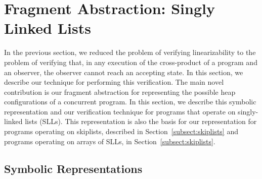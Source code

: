 \section{Fragment Abstraction: Singly Linked Lists}
\label{sec:fragment-abstraction}
In the previous section, we reduced the problem of verifying linearizability
to the problem of verifying
that, in any execution of the cross-product of a program and an observer, 
the observer cannot reach an accepting state.
In this section, we describe our technique for performing this verification.
The main novel contribution is our fragment abstraction for
representing the possible heap configurations of a concurrent program.
In this section, we describe this symbolic representation and our
verification technique
for programs that operate on singly-linked lists (SLLs). This
representation is also the basis for our representation for programs
operating on skiplists, described in Section~\ref{subsect:skiplists}
and programs operating on arrays of SLLs, in Section~\ref{subsect:skiplists}.




\subsection{Symbolic Representations}

